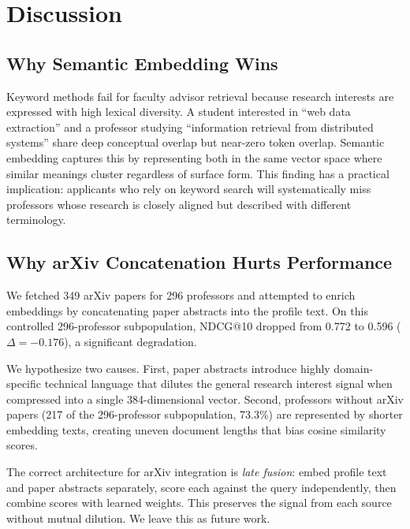 \documentclass[11pt,a4paper]{article}
\begin{document}
\section{Discussion}
\label{sec:discussion}

\subsection{Why Semantic Embedding Wins}

Keyword methods fail for faculty advisor retrieval because research interests
are expressed with high lexical diversity. A student interested in ``web data
extraction'' and a professor studying ``information retrieval from distributed
systems'' share deep conceptual overlap but near-zero token overlap. Semantic
embedding captures this by representing both in the same vector space where
similar meanings cluster regardless of surface form. This finding has a
practical implication: applicants who rely on keyword search will
systematically miss professors whose research is closely aligned but described
with different terminology.

\subsection{Why arXiv Concatenation Hurts Performance}

We fetched 349 arXiv papers for 296 professors and attempted to enrich
embeddings by concatenating paper abstracts into the profile text.
On this controlled 296-professor subpopulation, NDCG@10 dropped from
0.772 to 0.596 ($\Delta = -0.176$), a significant degradation.

We hypothesize two causes. First, paper abstracts introduce highly
domain-specific technical language that dilutes the general research interest
signal when compressed into a single 384-dimensional vector. Second,
professors without arXiv papers (217 of the 296-professor subpopulation,
73.3\%) are represented by shorter embedding texts, creating uneven
document lengths that bias cosine
similarity scores.

The correct architecture for arXiv integration is \textit{late fusion}: embed
profile text and paper abstracts separately, score each against the query
independently, then combine scores with learned weights. This preserves the
signal from each source without mutual dilution. We leave this as future work.
\end{document}
